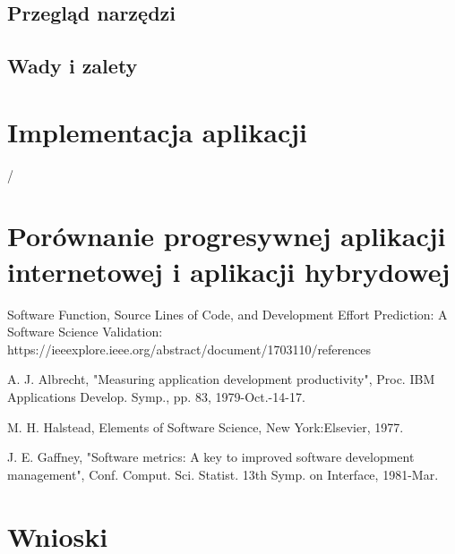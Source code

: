 \documentclass[a4paper,12pt,twoside,openany]{report}
\begin{document}
\section{Przegląd narzędzi}
\section{Wady i zalety}

\chapter{Implementacja aplikacji}/

\chapter{Porównanie progresywnej aplikacji internetowej i aplikacji hybrydowej}

Software Function, Source Lines of Code, and Development Effort Prediction: A Software Science Validation:
https://ieeexplore.ieee.org/abstract/document/1703110/references

 A. J. Albrecht, "Measuring application development productivity", Proc. IBM Applications Develop. Symp., pp. 83, 1979-Oct.-14-17.

M. H. Halstead, Elements of Software Science, New York:Elsevier, 1977.
   
 J. E. Gaffney, "Software metrics: A key to improved software development management", Conf. Comput. Sci. Statist. 13th Symp. on Interface, 1981-Mar.
 

\chapter{Wnioski}


\begin{thebibliography}{99}

\end{thebibliography}

\zakonczenie  %
\end{document}

